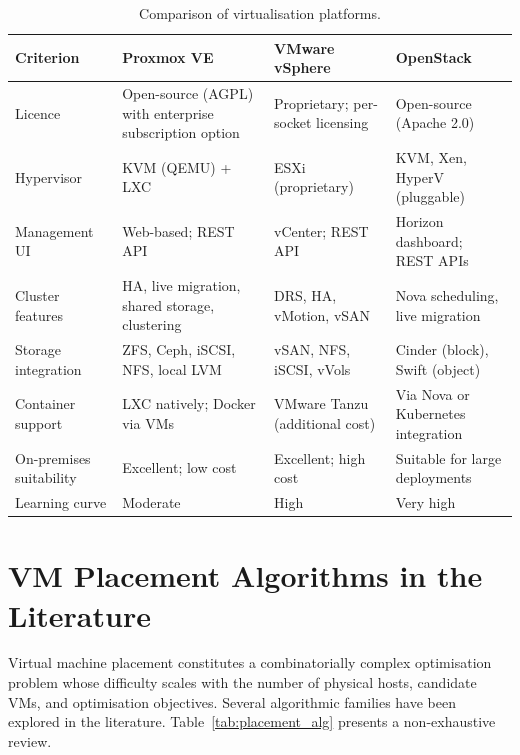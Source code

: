\documentclass[12pt,a4paper]{report}
\begin{document}
\begin{table}[htbp]
\centering
\caption{Comparison of virtualisation platforms.}
\label{tab:virt_platforms}
\begin{tabular}{L{2.8cm} L{3.5cm} L{3.5cm} L{3.5cm}}
\toprule
\textbf{Criterion} & \textbf{Proxmox VE} & \textbf{VMware vSphere} & \textbf{OpenStack} \\
\midrule
Licence             & Open-source (AGPL) with enterprise subscription option & Proprietary; per-socket licensing & Open-source (Apache 2.0) \\
\addlinespace
Hypervisor          & KVM (QEMU) + LXC & ESXi (proprietary) & KVM, Xen, HyperV (pluggable) \\
\addlinespace
Management UI       & Web-based; REST API & vCenter; REST API & Horizon dashboard; REST APIs \\
\addlinespace
Cluster features    & HA, live migration, shared storage, clustering & DRS, HA, vMotion, vSAN & Nova scheduling, live migration \\
\addlinespace
Storage integration & ZFS, Ceph, iSCSI, NFS, local LVM & vSAN, NFS, iSCSI, vVols & Cinder (block), Swift (object) \\
\addlinespace
Container support   & LXC natively; Docker via VMs & VMware Tanzu (additional cost) & Via Nova or Kubernetes integration \\
\addlinespace
On-premises suitability & Excellent; low cost & Excellent; high cost & Suitable for large deployments \\
\addlinespace
Learning curve      & Moderate & High & Very high \\
\bottomrule
\end{tabular}
\end{table}

\section{VM Placement Algorithms in the Literature}

Virtual machine placement constitutes a combinatorially complex optimisation problem
whose difficulty scales with the number of physical hosts, candidate VMs, and
optimisation objectives. Several algorithmic families have been explored in the
literature. Table~\ref{tab:placement_alg} presents a non-exhaustive review.
\end{document}
